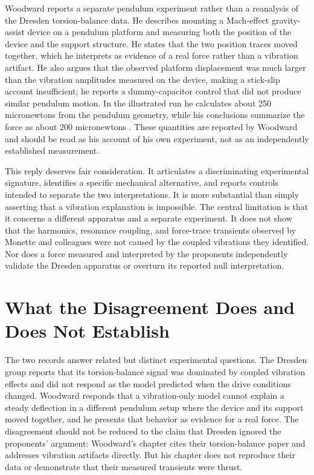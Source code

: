 \documentclass[11pt]{article}
\begin{document}
Woodward reports a separate pendulum experiment rather than a reanalysis of the Dresden torsion-balance data. He describes mounting a Mach-effect gravity-assist device on a pendulum platform and measuring both the position of the device and the support structure. He states that the two position traces moved together, which he interprets as evidence of a real force rather than a vibration artifact. He also argues that the observed platform displacement was much larger than the vibration amplitudes measured on the device, making a stick-slip account insufficient; he reports a dummy-capacitor control that did not produce similar pendulum motion. In the illustrated run he calculates about 250 micronewtons from the pendulum geometry, while his conclusions summarize the force as about 200 micronewtons \cite{Woodward2021}. These quantities are reported by Woodward and should be read as his account of his own experiment, not as an independently established measurement.

This reply deserves fair consideration. It articulates a discriminating experimental signature, identifies a specific mechanical alternative, and reports controls intended to separate the two interpretations. It is more substantial than simply asserting that a vibration explanation is impossible. The central limitation is that it concerns a different apparatus and a separate experiment. It does not show that the harmonics, resonance coupling, and force-trace transients observed by Monette and colleagues were not caused by the coupled vibrations they identified. Nor does a force measured and interpreted by the proponents independently validate the Dresden apparatus or overturn its reported null interpretation.

\section{What the Disagreement Does and Does Not Establish}

The two records answer related but distinct experimental questions. The Dresden group reports that its torsion-balance signal was dominated by coupled vibration effects and did not respond as the model predicted when the drive conditions changed. Woodward responds that a vibration-only model cannot explain a steady deflection in a different pendulum setup where the device and its support moved together, and he presents that behavior as evidence for a real force. The disagreement should not be reduced to the claim that Dresden ignored the proponents' argument: Woodward's chapter cites their torsion-balance paper and addresses vibration artifacts directly. But his chapter does not reproduce their data or demonstrate that their measured transients were thrust.
\end{document}
